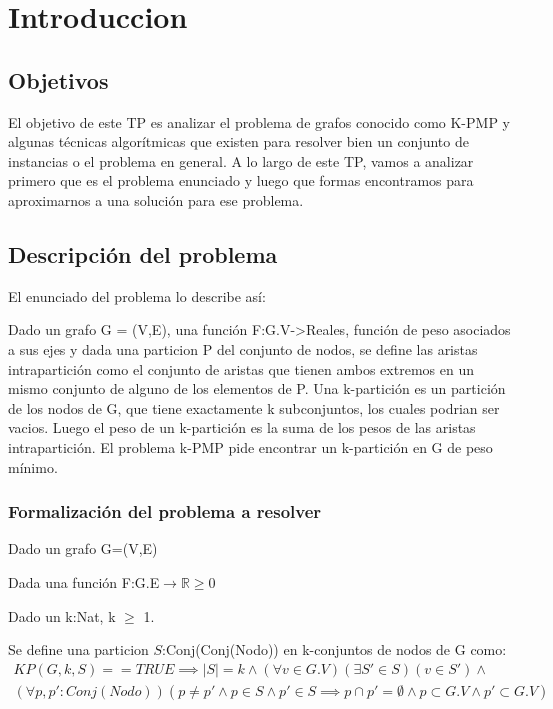 \section{Introduccion}

\subsection{Objetivos}

El objetivo de este TP es analizar el problema de grafos conocido como K-PMP y algunas t\'ecnicas algor\'itmicas que existen para resolver bien un conjunto de instancias o el problema en general.
A lo largo de este TP, vamos a analizar primero que es el problema enunciado y luego que formas encontramos para aproximarnos a una soluci\'on para ese problema.

\subsection{Descripci\'on del problema}

El enunciado del problema lo describe as\'i:

Dado un grafo G = (V,E), una funci\'on F:G.V->Reales, funci\'on de peso asociados a sus ejes y dada una particion P del conjunto de nodos, se define las aristas intrapartici\'on como el conjunto de aristas que tienen ambos extremos en un mismo conjunto de alguno de los elementos de P.
Una k-partici\'on es un partici\'on de los nodos de G, que tiene exactamente k subconjuntos, los cuales podrian ser vacios. Luego el peso de un k-partici\'on es la suma de los pesos de las aristas intrapartici\'on.
El problema k-PMP pide encontrar un k-partici\'on en G de peso m\'inimo.

\subsubsection{Formalizaci\'on del problema a resolver}


Dado un grafo G=(V,E)

Dada una funci\'on F:G.E$\rightarrow$$\mathbb{R} \geq 0$

Dado un k:Nat, k $\geq$ 1.

Se define una particion $S$:Conj(Conj(Nodo)) en k-conjuntos de nodos de G como:
\begin{align*}
KP(G,k,S)==TRUE \implies
|S|=k \wedge (\forall v \in G.V)(\exists S'\in S)(v \in S') \wedge \\
(\forall p,p':Conj(Nodo))(p \neq p' \wedge p \in S \wedge p' \in S \implies p \cap p' = \emptyset \wedge p \subset G.V \wedge p' \subset G.V)   
\end{align*}


